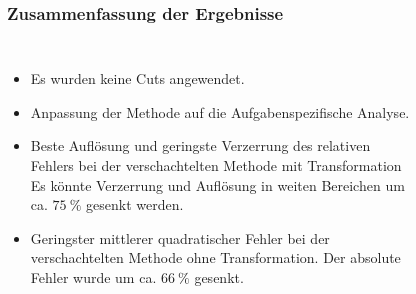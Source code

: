 \documentclass[aspectratio=1610, professionalfonts, 9pt]{beamer}
\begin{document}
  \begin{frame}
    \frametitle{Zusammenfassung der Ergebnisse}
    \begin{columns}
      \begin{itemize}
        \item Es wurden keine Cuts angewendet.
        \item Anpassung der Methode auf die Aufgabenspezifische Analyse.
        \item Beste Auflösung und geringste Verzerrung des relativen Fehlers bei der verschachtelten Methode mit Transformation
              Es könnte Verzerrung und Auflösung in weiten Bereichen um ca. $\SI{75}{\percent}$ gesenkt werden.
        \item Geringster mittlerer quadratischer Fehler bei der verschachtelten Methode ohne Transformation.
              Der absolute Fehler wurde um ca. $\SI{66}{\percent}$ gesenkt.
      \end{itemize}
      \begin{figure}
        \centering
        \parbox{0.49\textwidth}{%

          }

      \end{figure}
    \end{columns}
  \end{frame}
\end{document}
